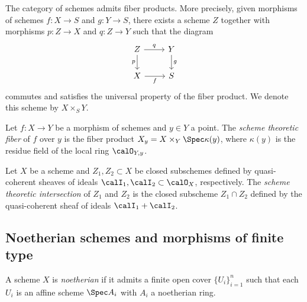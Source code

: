     \begin{theorem}\label{thm:fiber_product_of_schemes_exists}
        The category of schemes admits fiber products.
        More precisely, given morphisms of schemes \(f : X \to S\) and \(g : Y \to S\), there exists a scheme \(Z\) together with morphisms \(p : Z \to X\) and \(q : Z \to Y\) such that the diagram
        \[
            \begin{tikzcd}
                Z \arrow[r, "q"] \arrow[d, "p"'] & Y \arrow[d, "g"] \\
                X \arrow[r, "f"'] & S
            \end{tikzcd}
        \]
        commutes and satisfies the universal property of the fiber product.
        We denote this scheme by \(X \times_S Y\).
    \end{theorem}

    \begin{definition}\label{def:scheme_theoretic_fiber}
        Let \(f : X \to Y\) be a morphism of schemes and \(y \in Y\) a point.
        The \emph{scheme theoretic fiber} of \(f\) over \(y\) is the fiber product \(X_y = X \times_Y \Spec \kappa(y)\), where \(\kappa(y)\) is the residue field of the local ring \(\calO_{Y,y}\).
        
    \end{definition}

    \begin{definition}\label{def:scheme_theoretic_intersection}
        Let \(X\) be a scheme and \(Z_1, Z_2 \subset X\) be closed subschemes defined by quasi-coherent sheaves of ideals \(\calI_1, \calI_2 \subset \calO_X\), respectively.
        The \emph{scheme theoretic intersection} of \(Z_1\) and \(Z_2\) is the closed subscheme \(Z_1 \cap Z_2\) defined by the quasi-coherent sheaf of ideals \(\calI_1 + \calI_2\).
    \end{definition}


\subsection{Noetherian schemes and morphisms of finite type}

    \begin{definition}\label{def:noetherian_scheme}
        A scheme \(X\) is \emph{noetherian} if it admits a finite open cover \(\{U_i\}_{i=1}^n\) such that each \(U_i\) is an affine scheme \(\Spec A_i\) with \(A_i\) a noetherian ring.
    \end{definition}

